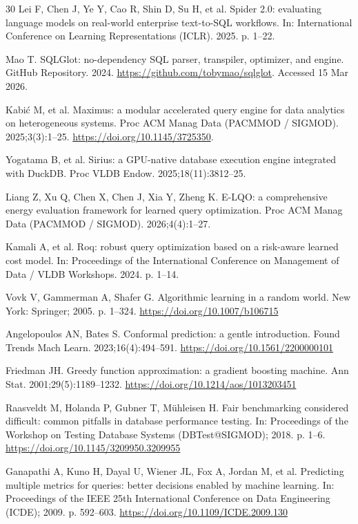 \documentclass[10pt,a4paper]{article}
\begin{document}
{\begin{thebibliography}{30}
Lei F, Chen J, Ye Y, Cao R, Shin D, Su H, et al. Spider 2.0: evaluating language models on real-world enterprise text-to-SQL workflows. In: International Conference on Learning Representations (ICLR). 2025. p. 1--22.

Mao T. SQLGlot: no-dependency SQL parser, transpiler, optimizer, and engine. GitHub Repository. 2024. \url{https://github.com/tobymao/sqlglot}. Accessed 15 Mar 2026.

 Kabi\'{c} M, et al. Maximus: a modular accelerated query engine for data analytics on heterogeneous systems. Proc ACM Manag Data (PACMMOD / SIGMOD). 2025;3(3):1--25. \url{https://doi.org/10.1145/3725350}.

 Yogatama B, et al. Sirius: a GPU-native database execution engine integrated with DuckDB. Proc VLDB Endow. 2025;18(11):3812--25.

 Liang Z, Xu Q, Chen X, Chen J, Xia Y, Zheng K. E-LQO: a comprehensive energy evaluation framework for learned query optimization. Proc ACM Manag Data (PACMMOD / SIGMOD). 2026;4(4):1--27.

 Kamali A, et al. Roq: robust query optimization based on a risk-aware learned cost model. In: Proceedings of the International Conference on Management of Data / VLDB Workshops. 2024. p. 1--14.


Vovk V, Gammerman A, Shafer G. Algorithmic learning in a random world. New York: Springer; 2005. p. 1--324. \url{https://doi.org/10.1007/b106715}

Angelopoulos AN, Bates S. Conformal prediction: a gentle introduction. Found Trends Mach Learn. 2023;16(4):494--591. \url{https://doi.org/10.1561/2200000101}

Friedman JH. Greedy function approximation: a gradient boosting machine. Ann Stat. 2001;29(5):1189--1232. \url{https://doi.org/10.1214/aos/1013203451}

Raasveldt M, Holanda P, Gubner T, M{\"u}hleisen H. Fair benchmarking considered difficult: common pitfalls in database performance testing. In: Proceedings of the Workshop on Testing Database Systems (DBTest@SIGMOD); 2018. p. 1--6. \url{https://doi.org/10.1145/3209950.3209955}

Ganapathi A, Kuno H, Dayal U, Wiener JL, Fox A, Jordan M, et al. Predicting multiple metrics for queries: better decisions enabled by machine learning. In: Proceedings of the IEEE 25th International Conference on Data Engineering (ICDE); 2009. p. 592--603. \url{https://doi.org/10.1109/ICDE.2009.130}


\end{thebibliography}}
\end{document}
